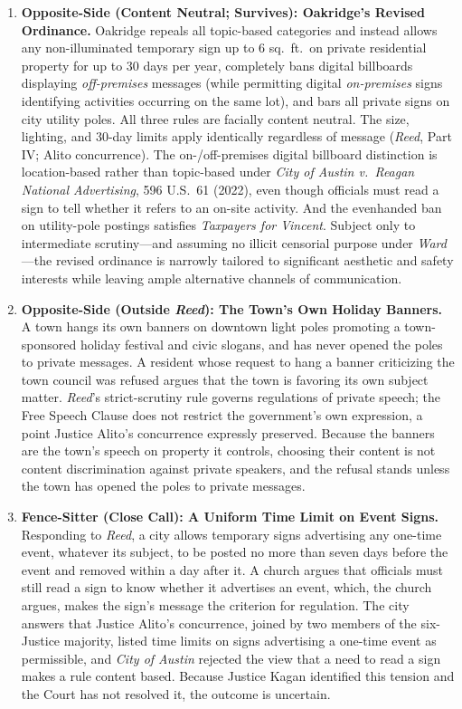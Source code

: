 \documentclass[12pt]{article}
\begin{document}
\begin{enumerate}
\item \textbf{Opposite-Side (Content Neutral; Survives): Oakridge's Revised Ordinance.} Oakridge repeals all topic-based categories and instead allows any non-illuminated temporary sign up to 6 sq.\ ft.\ on private residential property for up to 30 days per year, completely bans digital billboards displaying \textit{off-premises} messages (while permitting digital \textit{on-premises} signs identifying activities occurring on the same lot), and bars all private signs on city utility poles. All three rules are facially content neutral. The size, lighting, and 30-day limits apply identically regardless of message (\textit{Reed}, Part IV; Alito concurrence). The on-/off-premises digital billboard distinction is location-based rather than topic-based under \textit{City of Austin v.\ Reagan National Advertising}, 596 U.S.\ 61 (2022), even though officials must read a sign to tell whether it refers to an on-site activity. And the evenhanded ban on utility-pole postings satisfies \textit{Taxpayers for Vincent}. Subject only to intermediate scrutiny---and assuming no illicit censorial purpose under \textit{Ward}---the revised ordinance is narrowly tailored to significant aesthetic and safety interests while leaving ample alternative channels of communication.

\item \textbf{Opposite-Side (Outside \textit{Reed}): The Town's Own Holiday Banners.} A town hangs its own banners on downtown light poles promoting a town-sponsored holiday festival and civic slogans, and has never opened the poles to private messages. A resident whose request to hang a banner criticizing the town council was refused argues that the town is favoring its own subject matter. \textit{Reed}'s strict-scrutiny rule governs regulations of private speech; the Free Speech Clause does not restrict the government's own expression, a point Justice Alito's concurrence expressly preserved. Because the banners are the town's speech on property it controls, choosing their content is not content discrimination against private speakers, and the refusal stands unless the town has opened the poles to private messages.

\item \textbf{Fence-Sitter (Close Call): A Uniform Time Limit on Event Signs.} Responding to \textit{Reed}, a city allows temporary signs advertising any one-time event, whatever its subject, to be posted no more than seven days before the event and removed within a day after it. A church argues that officials must still read a sign to know whether it advertises an event, which, the church argues, makes the sign's message the criterion for regulation. The city answers that Justice Alito's concurrence, joined by two members of the six-Justice majority, listed time limits on signs advertising a one-time event as permissible, and \textit{City of Austin} rejected the view that a need to read a sign makes a rule content based. Because Justice Kagan identified this tension and the Court has not resolved it, the outcome is uncertain.

\end{enumerate}
\end{document}
